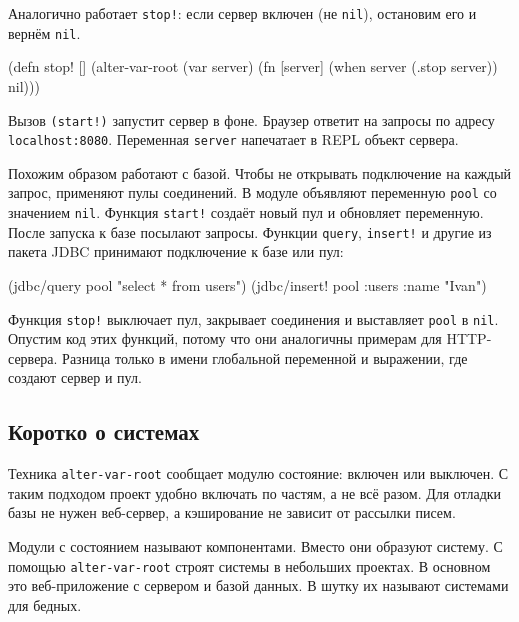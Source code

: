\noindent
Аналогично работает \verb|stop!|: если сервер включен (не \verb|nil|),
остановим его и вернём \verb|nil|.

\begin{english}
  \begin{clojure}
(defn stop! []
  (alter-var-root
   (var server)
   (fn [server]
     (when server
       (.stop server))
     nil)))
  \end{clojure}
\end{english}

Вызов \verb|(start!)| запустит сервер в фоне. Браузер ответит на запросы по
адресу \verb|localhost:8080|. Переменная \verb|server| напечатает в REPL
объект сервера.


Похожим образом работают с базой. Чтобы не открывать подключение на каждый
запрос, применяют пулы соединений. В модуле объявляют переменную \verb|pool|
со значением \verb|nil|. Функция \verb|start!| создаёт новый пул и обновляет
переменную. После запуска к базе посылают запросы. Функции \verb|query|,
\verb|insert!| и другие из пакета JDBC принимают подключение к базе или пул:

\begin{english}
  \begin{clojure}
(jdbc/query pool "select * from users")
(jdbc/insert! pool :users {:name "Ivan"})
  \end{clojure}
\end{english}

Функция \verb|stop!| выключает пул, закрывает соединения и выставляет
\verb|pool| в \verb|nil|. Опустим код этих функций, потому что они
аналогичны примерам для HTTP-сервера. Разница только в имени глобальной
переменной и выражении, где создают сервер и пул.

\subsection{Коротко о системах}


\label{systems-intro}

Техника \verb|alter-var-root| сообщает модулю состояние: включен или
выключен. С таким подходом проект удобно включать по частям, а не всё
разом. Для отладки базы не нужен веб-сервер, а кэширование не зависит от
рассылки писем.

Модули с состоянием называют компонентами. Вместо они образуют систему. С
помощью \verb|alter-var-root| строят системы в небольших проектах. В основном
это веб-приложение с сервером и базой данных. В шутку их называют системами для
бедных.

